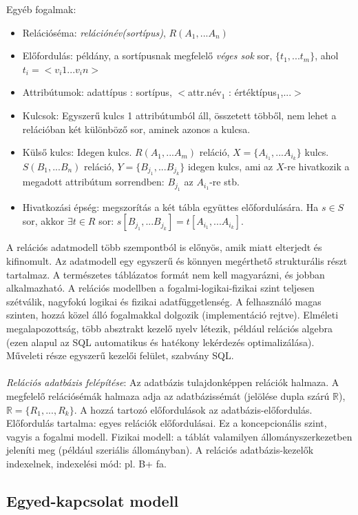 \documentclass[margin=0px]{article}
\begin{document}
Egyéb fogalmak:
\begin{itemize}
    \item Relációséma: \textit{relációnév(sortípus)}, $R(A_1,...A_n)$
    \item Előfordulás: példány, a sortípusnak megfelelő \textit{véges sok} sor, $\{t_1,...t_m\}$, ahol $t_i = <v_i1...v_in>$
    \item Attribútumok: adattípus : sortípus, $<$attr.név$_1$ : értéktípus$_1$,...$>$
    \item Kulcsok: Egyszerű kulcs 1 attribútumból áll, összetett többől, nem lehet a relációban két különböző sor, aminek azonos a kulcsa.
    \item Külső kulcs: Idegen kulcs. $R(A_1,...A_m)$ reláció, $X=\{A_{i_1},...A_{i_k}\}$ kulcs. $S(B_1,...B_n)$ reláció, $Y=\{B_{j_1},...B_{j_k}\}$ idegen kulcs, ami az $X$-re hivatkozik a megadott attribútum sorrendben: $B_{j_1}$ az $A_{i_1}$-re stb.
    \item Hivatkozási épség: megszorítás a két tábla együttes előfordulására. Ha $s \in S$ sor, akkor $\exists t \in R$ sor: $s[B_{j_1},...B_{j_k}] = t[A_{i_1},...A_{i_k}]$.
\end{itemize}
A relációs adatmodell több szempontból is előnyös, amik miatt elterjedt és kifinomult. Az adatmodell egy egyszerű és könnyen megérthető strukturális részt tartalmaz. A természetes táblázatos formát nem kell magyarázni, és jobban alkalmazható. A relációs modellben a fogalmi-logikai-fizikai szint teljesen szétválik, nagyfokú logikai és fizikai adatfüggetlenség. A felhasználó magas szinten, hozzá közel álló fogalmakkal dolgozik (implementáció rejtve). Elméleti megalapozottság, több absztrakt kezelő nyelv létezik, például relációs algebra (ezen alapul az SQL automatikus és hatékony lekérdezés optimalizálása). Műveleti része egyszerű kezelői felület, szabvány SQL. \\ \\

\textit{Relációs adatbázis felépítése}: Az adatbázis tulajdonképpen relációk halmaza. A megfelelő relációsémák halmaza adja az adatbázissémát (jelölése dupla szárú $\mathbb{R}$), $\mathbb{R} = \{R_1 , ... , R_k\}$. A hozzá tartozó előfordulások az adatbázis-előfordulás. Előfordulás tartalma: egyes relációk előfordulásai. Ez a koncepcionális szint, vagyis a fogalmi modell. Fizikai modell: a táblát valamilyen állományszerkezetben jeleníti meg (például szeriális állományban). A relációs adatbázis-kezelők indexelnek, indexelési mód: pl. B+ fa.

\subsection{Egyed-kapcsolat modell}
\end{document}
